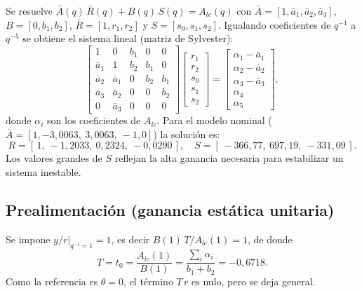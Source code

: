 \documentclass[a4paper,11pt]{report}
\begin{document}
Se resuelve $\bar A(q)\,\bar R(q) + B(q)\,S(q) = A_{lc}(q)$ con
$\bar A = [1, \bar a_1, \bar a_2, \bar a_3]$, $B = [0, b_1, b_2]$,
$\bar R = [1, r_1, r_2]$ y $S = [s_0, s_1, s_2]$. Igualando coeficientes de
$q^{-1}$ a $q^{-5}$ se obtiene el sistema lineal (matriz de Sylvester):
\begin{equation}
\begin{bmatrix}
1 & 0 & b_1 & 0 & 0 \\
\bar a_1 & 1 & b_2 & b_1 & 0 \\
\bar a_2 & \bar a_1 & 0 & b_2 & b_1 \\
\bar a_3 & \bar a_2 & 0 & 0 & b_2 \\
0 & \bar a_3 & 0 & 0 & 0
\end{bmatrix}
\begin{bmatrix} r_1 \\ r_2 \\ s_0 \\ s_1 \\ s_2 \end{bmatrix}
=
\begin{bmatrix}
\alpha_1 - \bar a_1 \\ \alpha_2 - \bar a_2 \\ \alpha_3 - \bar a_3 \\ \alpha_4 \\ \alpha_5
\end{bmatrix},
\end{equation}
donde $\alpha_i$ son los coeficientes de $A_{lc}$. Para el modelo nominal
($\bar A = [1, -3{,}0063,\ 3{,}0063,\ -1{,}0]$) la solución es:
\begin{equation}
  R = [\,1,\ -1{,}2033,\ 0{,}2324,\ -0{,}0290\,], \quad
  S = [\,-366{,}77,\ 697{,}19,\ -331{,}09\,].
\end{equation}
Los valores grandes de $S$ reflejan la alta ganancia necesaria para estabilizar
un sistema inestable.

\subsection{Prealimentación (ganancia estática unitaria)}

Se impone $y/r|_{q^{-1}=1} = 1$, es decir $B(1)\,T / A_{lc}(1) = 1$, de donde
\begin{equation}
  T = t_0 = \frac{A_{lc}(1)}{B(1)} = \frac{\sum_i \alpha_i}{b_1 + b_2} = -0{,}6718 .
\end{equation}
Como la referencia es $\theta = 0$, el término $T\,r$ es nulo, pero se deja
general.
\end{document}
